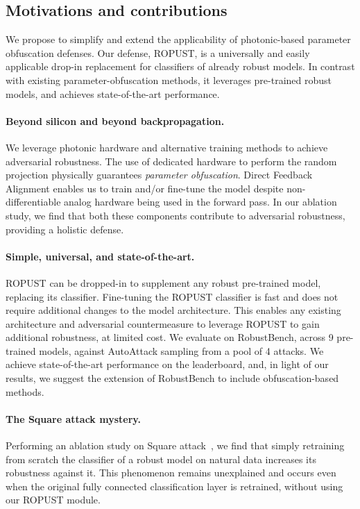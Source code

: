 \documentclass{article}
\begin{document}
\subsection{Motivations and contributions}

We propose to simplify and extend the applicability of photonic-based parameter obfuscation defenses. Our defense, ROPUST, is a universally and easily applicable drop-in replacement for classifiers of already robust models. In contrast with existing parameter-obfuscation methods, it leverages pre-trained robust models, and achieves state-of-the-art performance. 

\paragraph{Beyond silicon and beyond backpropagation.} We leverage photonic hardware and alternative training methods to achieve adversarial robustness. The use of dedicated hardware to perform the random projection physically guarantees \emph{parameter obfuscation}. Direct Feedback Alignment enables us to train and/or fine-tune the model despite non-differentiable analog hardware being used in the forward pass. In our ablation study, we find that both these components contribute to adversarial robustness, providing a holistic defense.

\paragraph{Simple, universal, and state-of-the-art.} ROPUST can be dropped-in to supplement any robust pre-trained model, replacing its classifier. Fine-tuning the ROPUST classifier is fast and does not require additional changes to the model architecture. This enables any existing architecture and adversarial countermeasure to leverage ROPUST to gain additional robustness, at limited cost.  We evaluate on RobustBench, across 9 pre-trained models, against AutoAttack sampling from a pool of 4 attacks. We achieve state-of-the-art performance on the leaderboard, and, in light of our results, we suggest the extension of RobustBench to include obfuscation-based methods. 

\paragraph{The Square attack mystery.} Performing an ablation study on Square attack~\cite{andriushchenko2019square}, we find that simply retraining from scratch the classifier of a robust model on natural data increases its robustness against it. This phenomenon remains unexplained and occurs even when the original fully connected classification layer is retrained, without using our ROPUST module.
\end{document}
